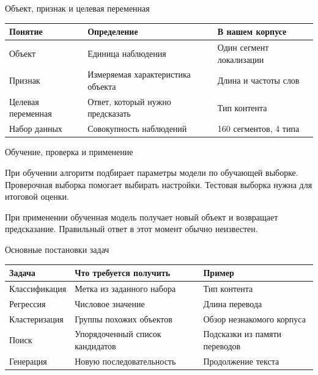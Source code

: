 \documentclass[aspectratio=169,12pt]{beamer}
\begin{document}
\begin{frame}{Объект, признак и целевая переменная}
\color{ink}
{\small\renewcommand{\arraystretch}{1.15}\begin{tabular}{@{}Л{0.22} Л{0.35} Л{0.35}@{}}\toprule
Понятие & Определение & В нашем корпусе\\\midrule
Объект & Единица наблюдения & Один сегмент локализации\\[0.15em]
Признак & Измеряемая характеристика объекта & Длина и частоты слов\\[0.15em]
Целевая переменная & Ответ, который нужно предсказать & Тип контента\\[0.15em]
Набор данных & Совокупность наблюдений & 160 сегментов, 4 типа\\[0.15em]\bottomrule\end{tabular}}
\end{frame}

\begin{frame}{Обучение, проверка и применение}
\color{ink}
{\small При обучении алгоритм подбирает параметры модели по обучающей выборке. Проверочная выборка помогает выбирать настройки. Тестовая выборка нужна для итоговой оценки.
\par\vspace{0.6em}При применении обученная модель получает новый объект и возвращает предсказание. Правильный ответ в этот момент обычно неизвестен.}
\end{frame}

\begin{frame}{Основные постановки задач}
\color{ink}
{\small\renewcommand{\arraystretch}{1.15}\begin{tabular}{@{}Л{0.23} Л{0.36} Л{0.33}@{}}\toprule
Задача & Что требуется получить & Пример\\\midrule
Классификация & Метка из заданного набора & Тип контента\\[0.15em]
Регрессия & Числовое значение & Длина перевода\\[0.15em]
Кластеризация & Группы похожих объектов & Обзор незнакомого корпуса\\[0.15em]
Поиск & Упорядоченный список кандидатов & Подсказки из памяти переводов\\[0.15em]
Генерация & Новую последовательность & Продолжение текста\\[0.15em]\bottomrule\end{tabular}}
\end{frame}
\end{document}
